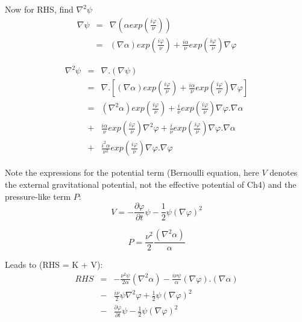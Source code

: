 \noindent Now for RHS, find $\nabla^2 \psi$
\begin{eqnarray}
\nabla\psi &=& \nabla\left(\alpha exp\left(\frac{i\varphi}{\nu}\right)\right)\\
&=& (\nabla\alpha) exp\left(\frac{i\varphi}{\nu}\right) + \frac{i\alpha}{\nu} exp\left(\frac{i\varphi}{\nu}\right)\nabla\varphi \nonumber
\end{eqnarray}

\begin{eqnarray}
\nabla^2\psi &=& \nabla . (\nabla \psi) \\ \nonumber
&=& \nabla.[(\nabla\alpha) exp\left(\frac{i\varphi}{\nu}\right) + \frac{i\alpha}{\nu} exp\left(\frac{i\varphi}{\nu}\right)\nabla\varphi] \\ \nonumber
&=& (\nabla^2\alpha)exp\left(\frac{i\varphi}{\nu}\right) +\frac{i}{\nu} exp\left(\frac{i\varphi}{\nu}\right)\nabla\varphi.\nabla\alpha \\ \nonumber
&+&\frac{i\alpha}{\nu} exp\left(\frac{i\varphi}{\nu}\right)\nabla^2\varphi +\frac{i}{\nu} \nonumber exp\left(\frac{i\varphi}{\nu}\right)\nabla\varphi.\nabla\alpha \\ \nonumber
&+& \frac{i^2\alpha}{\nu^2}exp\left(\frac{i\varphi}{\nu}\right)\nabla\varphi.\nabla\varphi \nonumber
\end{eqnarray}

\noindent Note the expressions for the potential term (Bernoulli equation, here $V$ denotes the external gravitational potential, not the effective potential of Ch4) and the pressure-like term $P$:
\begin{equation}
V = -\frac{\partial\varphi}{\partial t}\psi - \frac{1}{2}\psi(\nabla\varphi)^2 
\end{equation}

\begin{equation}
P = \frac{\nu^2}{2}\frac{(\nabla^2\alpha)}{\alpha}
\end{equation}

\noindent Leads to (RHS = K + V):
\begin{eqnarray}
RHS &=& -\frac{\nu^2\psi}{2\alpha}(\nabla^2\alpha) -\frac{i\nu\psi}{\alpha}(\nabla\varphi).(\nabla\alpha) \\ \nonumber
&-&\frac{i\nu}{2}\psi\nabla^2\varphi + \frac{1}{2}\psi(\nabla\varphi)^2 \\ \nonumber
&-&\frac{\partial\varphi}{\partial t}\psi - \frac{1}{2}\psi(\nabla\varphi)^2  \\ \nonumber
\end{eqnarray}

